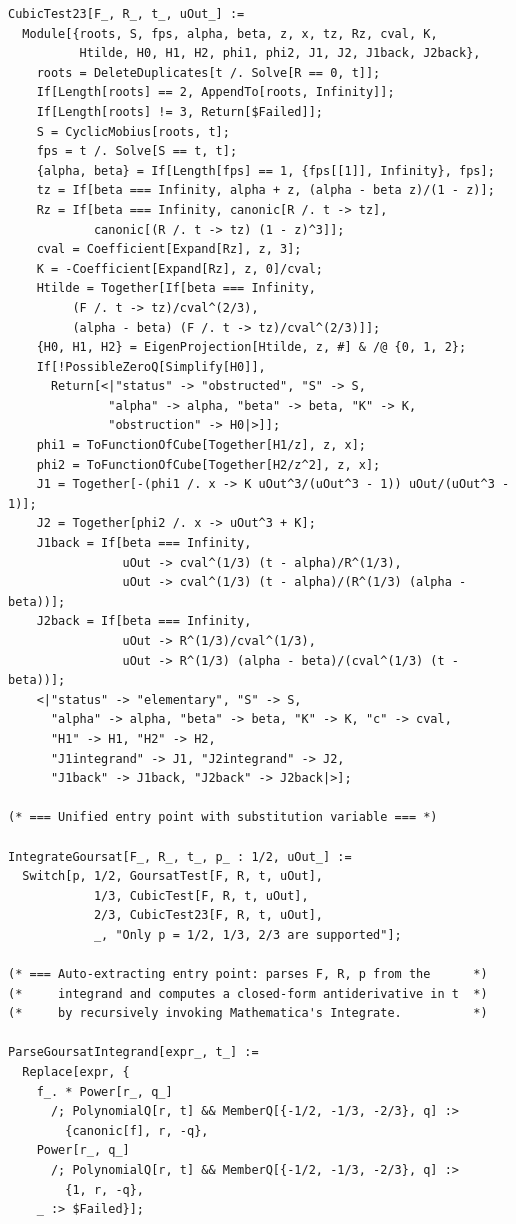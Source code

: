 \documentclass[11pt,a4paper]{article}
\theoremstyle{plain}
\theoremstyle{definition}
\theoremstyle{remark}
\begin{document}
\begin{lstlisting}
CubicTest23[F_, R_, t_, uOut_] :=
  Module[{roots, S, fps, alpha, beta, z, x, tz, Rz, cval, K,
          Htilde, H0, H1, H2, phi1, phi2, J1, J2, J1back, J2back},
    roots = DeleteDuplicates[t /. Solve[R == 0, t]];
    If[Length[roots] == 2, AppendTo[roots, Infinity]];
    If[Length[roots] != 3, Return[$Failed]];
    S = CyclicMobius[roots, t];
    fps = t /. Solve[S == t, t];
    {alpha, beta} = If[Length[fps] == 1, {fps[[1]], Infinity}, fps];
    tz = If[beta === Infinity, alpha + z, (alpha - beta z)/(1 - z)];
    Rz = If[beta === Infinity, canonic[R /. t -> tz],
            canonic[(R /. t -> tz) (1 - z)^3]];
    cval = Coefficient[Expand[Rz], z, 3];
    K = -Coefficient[Expand[Rz], z, 0]/cval;
    Htilde = Together[If[beta === Infinity,
         (F /. t -> tz)/cval^(2/3),
         (alpha - beta) (F /. t -> tz)/cval^(2/3)]];
    {H0, H1, H2} = EigenProjection[Htilde, z, #] & /@ {0, 1, 2};
    If[!PossibleZeroQ[Simplify[H0]],
      Return[<|"status" -> "obstructed", "S" -> S,
              "alpha" -> alpha, "beta" -> beta, "K" -> K,
              "obstruction" -> H0|>]];
    phi1 = ToFunctionOfCube[Together[H1/z], z, x];
    phi2 = ToFunctionOfCube[Together[H2/z^2], z, x];
    J1 = Together[-(phi1 /. x -> K uOut^3/(uOut^3 - 1)) uOut/(uOut^3 - 1)];
    J2 = Together[phi2 /. x -> uOut^3 + K];
    J1back = If[beta === Infinity,
                uOut -> cval^(1/3) (t - alpha)/R^(1/3),
                uOut -> cval^(1/3) (t - alpha)/(R^(1/3) (alpha - beta))];
    J2back = If[beta === Infinity,
                uOut -> R^(1/3)/cval^(1/3),
                uOut -> R^(1/3) (alpha - beta)/(cval^(1/3) (t - beta))];
    <|"status" -> "elementary", "S" -> S,
      "alpha" -> alpha, "beta" -> beta, "K" -> K, "c" -> cval,
      "H1" -> H1, "H2" -> H2,
      "J1integrand" -> J1, "J2integrand" -> J2,
      "J1back" -> J1back, "J2back" -> J2back|>];

(* === Unified entry point with substitution variable === *)

IntegrateGoursat[F_, R_, t_, p_ : 1/2, uOut_] :=
  Switch[p, 1/2, GoursatTest[F, R, t, uOut],
            1/3, CubicTest[F, R, t, uOut],
            2/3, CubicTest23[F, R, t, uOut],
            _, "Only p = 1/2, 1/3, 2/3 are supported"];

(* === Auto-extracting entry point: parses F, R, p from the      *)
(*     integrand and computes a closed-form antiderivative in t  *)
(*     by recursively invoking Mathematica's Integrate.          *)

ParseGoursatIntegrand[expr_, t_] :=
  Replace[expr, {
    f_. * Power[r_, q_]
      /; PolynomialQ[r, t] && MemberQ[{-1/2, -1/3, -2/3}, q] :>
        {canonic[f], r, -q},
    Power[r_, q_]
      /; PolynomialQ[r, t] && MemberQ[{-1/2, -1/3, -2/3}, q] :>
        {1, r, -q},
    _ :> $Failed}];


\end{lstlisting}
\end{document}
